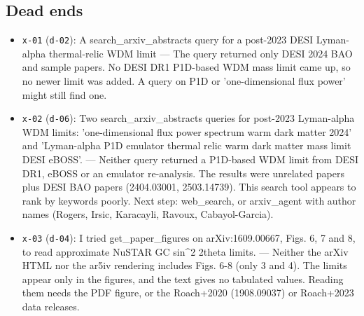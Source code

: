 \documentclass[11pt,a4paper]{article}
\begin{document}
\subsection{Dead ends}
\begin{itemize}
  \item \texttt{x-01} (\texttt{d-02}): A search\_arxiv\_abstracts query for a post-2023 DESI Lyman-alpha thermal-relic WDM limit --- The query returned only DESI 2024 BAO and sample papers. No DESI DR1 P1D-based WDM mass limit came up, so no newer limit was added. A query on P1D or 'one-dimensional flux power' might still find one.
  \item \texttt{x-02} (\texttt{d-06}): Two search\_arxiv\_abstracts queries for post-2023 Lyman-alpha WDM limits: 'one-dimensional flux power spectrum warm dark matter 2024' and 'Lyman-alpha P1D emulator thermal relic warm dark matter mass limit DESI eBOSS'. --- Neither query returned a P1D-based WDM limit from DESI DR1, eBOSS or an emulator re-analysis. The results were unrelated papers plus DESI BAO papers (2404.03001, 2503.14739). This search tool appears to rank by keywords poorly. Next step: web\_search, or arxiv\_agent with author names (Rogers, Irsic, Karacayli, Ravoux, Cabayol-Garcia).
  \item \texttt{x-03} (\texttt{d-04}): I tried get\_paper\_figures on arXiv:1609.00667, Figs. 6, 7 and 8, to read approximate NuSTAR GC sin\textasciicircum{}2 2theta limits. --- Neither the arXiv HTML nor the ar5iv rendering includes Figs. 6-8 (only 3 and 4). The limits appear only in the figures, and the text gives no tabulated values. Reading them needs the PDF figure, or the Roach+2020 (1908.09037) or Roach+2023 data releases.
\end{itemize}
\end{document}
